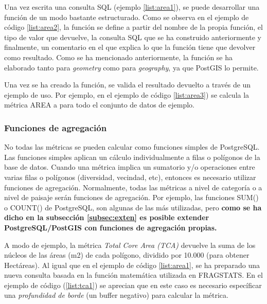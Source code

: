 \label{list:area1}

Una vez escrita una consulta SQL (ejemplo \ref{list:area1}), se puede desarrollar una función de un modo bastante estructurado. Como se observa en el ejemplo de código \ref{list:area2}, la función se define a partir del nombre de la propia función, el tipo de valor que devuelve, la consulta SQL que se ha construido anteriormente y finalmente, un comentario en el que explica lo que la función tiene que devolver como resultado. Como se ha mencionado anteriormente, la función se ha elaborado tanto para \textit{geometry} como para \textit{geography}, ya que PostGIS lo permite.

\label{list:area2}

Una vez se ha creado la función, se valida el resultado devuelto a través de un ejemplo de uso. Por ejemplo, en el ejemplo de código \ref{list:area3}) se calcula la métrica AREA a para todo el conjunto de datos de ejemplo.

\label{list:area3}


\subsubsection{Funciones de agregación}

No todas las métricas se pueden calcular como funciones simples de PostgreSQL. Las funciones simples aplican un cálculo individualmente a filas o polígonos de la base de datos. Cuando una métrica implica un sumatorio y/o operaciones entre varias filas o polígonos (diversidad, vecindad, etc), entonces es necesario utilizar funciones de agregación. Normalmente, todas las métricas a nivel de categoría o a nivel de paisaje serán funciones de agregación. Por ejemplo, las funciones SUM() o COUNT() de PostgreSQL, son algunas de las más utilizadas, pero \textbf{como se ha dicho en la subsección \ref{subsec:exten} es posible extender PostgreSQL/PostGIS con funciones de agregación propias.}

A modo de ejemplo, la métrica \textit{Total Core Area (TCA)} devuelve la suma de los núcleos de las áreas (m2) de cada polígono, dividido por 10.000 (para obtener Hectáreas). Al igual que en el ejemplo de código \ref{list:area1}, se ha preparado una nueva consulta basada en la función matemática utilizada en FRAGSTATS. En el ejemplo de código (\ref{list:tca1}) se aprecian que en este caso es necesario específicar una \textit{profundidad de borde} (un buffer negativo) para calcular la métrica.


